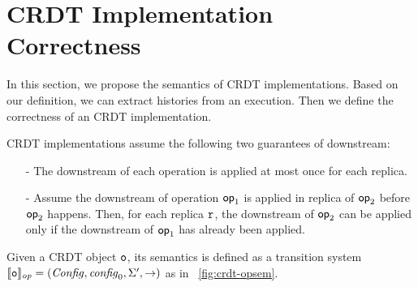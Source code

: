 
\section{CRDT Implementation Correctness}
\label{sec:CRDT implementation semantics and correctness}

In this section, we propose the semantics of CRDT implementations. Based on our definition, we can extract histories from an execution. Then we define the correctness of an CRDT implementation.




CRDT implementations assume the following two guarantees of downstream:

\begin{itemize}
\setlength{\itemsep}{0.5pt}
\item[-] The downstream of each operation is applied at most once for each replica.
\item[-] Assume the downstream of operation $\mathsf{op}_1$ is applied in replica of $\mathsf{op}_2$ before $\mathsf{op}_2$ happens. Then, for each replica $\mathtt{r}$, the downstream of $\mathsf{op}_2$ can be applied only if the downstream of $\mathsf{op}_1$ has already been applied.
\end{itemize}

Given a CRDT object $\mathtt{o}$, its semantics is defined as a transition system $\llbracket \mathtt{o} \rrbracket_{\mathit{op}} = (\mathit{Config},\mathit{config}_0,\Sigma',\rightarrow)$ as in \figurename~\ref{fig:crdt-opsem}.




